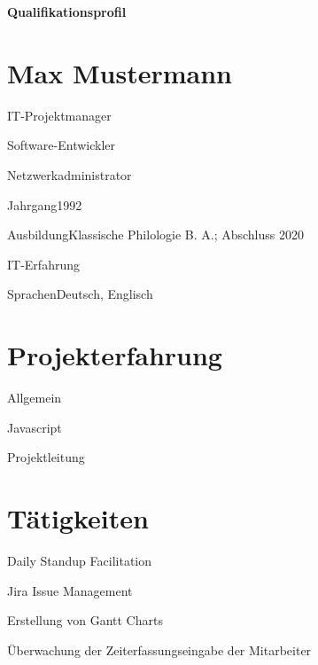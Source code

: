 \documentclass{germanqualificationprofile}
\begin{document}
\textbf{\sffamily\huge Qualifikationsprofil} \hspace*{\fill} \textbf{\normalsize\monthyear}

\vspace{2em}

\section*{Max Mustermann}

  \begin{listnobullet}
    \item IT-Projektmanager
    \item Software-Entwickler
    \item Netzwerkadministrator
  \end{listnobullet}

  \vspace{1.5em}

  \begin{qptable}{Jahrgang}1992\end{qptable}
  \begin{qptable}{Ausbildung}Klassische Philologie B. A.; Abschluss 2020\end{qptable}
  \begin{qptable}{IT-Erfahrung}\end{qptable}
  \begin{qptable}{Sprachen}Deutsch, Englisch\end{qptable}

\section*{Projekterfahrung}

  \begin{qptable}{Allgemein}\end{qptable}
  \begin{qptable}{Javascript}\end{qptable}
  \begin{qptable}{Projektleitung}\end{qptable}

\section*{Tätigkeiten}

  \begin{listbullet}
    \item Daily Standup Facilitation
    \item Jira Issue Management
    \item Erstellung von Gantt Charts
    \item Überwachung der Zeiterfassungseingabe der Mitarbeiter
  \end{listbullet}
\end{document}
